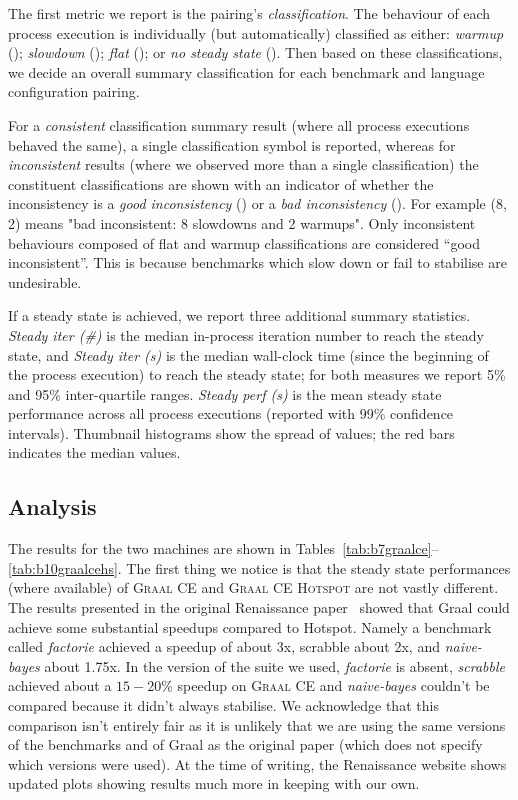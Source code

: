 \documentclass[a4paper]{article}
\newcommand{\graalce}{\textsc{Graal CE}\xspace}
\newcommand{\graalcehs}{\textsc{Graal CE Hotspot}\xspace}
\begin{document}
The first metric we report is the pairing's \emph{classification}. The
behaviour of each process execution is individually (but automatically) classified as either:
\emph{warmup} (\warmup); \emph{slowdown} (\slowdown); \emph{flat} (\flatc); or
\emph{no steady state} (\nosteadystate). Then based on these classifications,
we decide an overall summary classification for each benchmark and language
configuration pairing.

For a \emph{consistent} classification summary result (where all process
executions behaved the same), a single classification symbol is reported,
whereas for \emph{inconsistent} results (where we observed more than a single
classification) the constituent classifications are shown with an indicator of
whether the inconsistency is a \emph{good inconsistency} (\goodinconsistent)
or a \emph{bad inconsistency} (\badinconsistent). For example
\badinconsistent(8\slowdown, 2\warmup) means "bad inconsistent: 8 slowdowns
and 2 warmups". Only inconsistent behaviours composed of flat and warmup
classifications are considered ``good inconsistent''. This is because
benchmarks which slow down or fail to stabilise are undesirable.

If a steady state is achieved, we report three additional summary statistics.
\emph{Steady iter (\#)} is the median in-process iteration number to reach the
steady state, and \emph{Steady iter (s)} is the median wall-clock time (since
the beginning of the process execution) to reach the steady state; for both
measures we report 5\% and 95\% inter-quartile ranges. \emph{Steady perf (s)}
is the mean steady state performance across all process executions (reported
with 99\% confidence intervals). Thumbnail histograms show the spread of
values; the red bars indicates the median values.

\subsection{Analysis}

The results for the two machines are shown in
Tables~\ref{tab:b7graalce}--\ref{tab:b10graalcehs}. The first thing we notice
is that the steady state performances (where
available) of \graalce and \graalcehs are not vastly different. The results
presented in the original Renaissance paper~\cite{prokopec19renaissance} showed
that Graal could achieve some substantial speedups compared to Hotspot. Namely
a benchmark called \emph{factorie} achieved a speedup of about 3x, scrabble
about 2x, and \emph{naive-bayes} about 1.75x. In the version of the suite we
used, \emph{factorie} is absent, \emph{scrabble} achieved about a $15-20\%$
speedup on \graalce and \emph{naive-bayes} couldn't be compared because it
didn't always stabilise. We acknowledge that this comparison isn't entirely
fair as it is unlikely that we are using the same versions of the benchmarks
and of Graal as the original paper (which does not specify which versions were
used). At the time of writing, the Renaissance website shows updated plots
showing results much more in keeping with our own.
\end{document}
